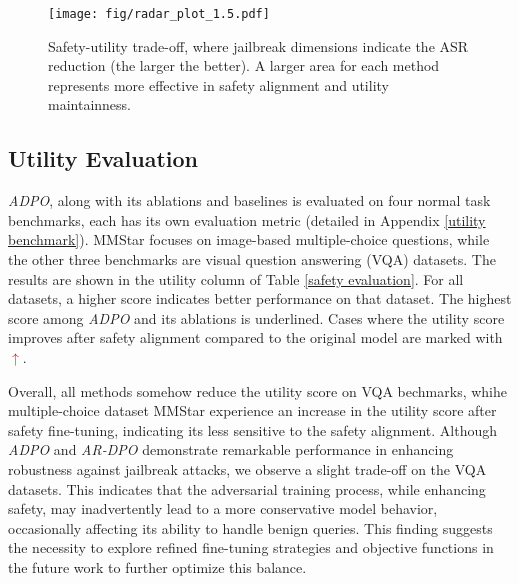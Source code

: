 
\begin{figure}[t]
    \centering
    \texttt{[image: fig/radar\_plot\_1.5.pdf]}
    \setlength{\abovecaptionskip}{0.2cm}
    \vspace{-1em}
    \caption{Safety-utility trade-off, where jailbreak dimensions indicate the ASR reduction (the larger the better). A larger area for each method represents more effective in safety alignment and utility maintainness. } 
    \label{radar}
    \vspace{-1em}
\end{figure}

\vspace{-0.5em}
\subsection{Utility Evaluation}
\vspace{-0.5em}
\textit{ADPO}, along with its ablations and baselines is evaluated on four normal task benchmarks, each has its own evaluation metric (detailed in Appendix \ref{utility benchmark}). MMStar focuses on image-based multiple-choice questions, while the other three benchmarks are visual question answering (VQA) datasets. The results are shown in the utility column of Table \ref{safety evaluation}. For all datasets, a higher score indicates better performance on that dataset. The highest score among \textit{ADPO} and its ablations is underlined. Cases where the utility score improves after safety alignment compared to the original model are marked with \textcolor{red}{$\uparrow$}.

Overall, all methods somehow reduce the utility score on VQA bechmarks, whihe  multiple-choice dataset MMStar experience an increase in the utility score after safety fine-tuning, indicating its less sensitive to the safety alignment.
Although \textit{ADPO} and \textit{AR-DPO} demonstrate remarkable performance in enhancing robustness against jailbreak attacks, we observe a slight trade-off on the VQA datasets. This indicates that the adversarial training process, while enhancing safety, may inadvertently lead to a more conservative model behavior, occasionally affecting its ability to handle benign queries. This finding suggests the necessity to explore refined fine-tuning strategies and objective functions in the future work to further optimize this balance.



